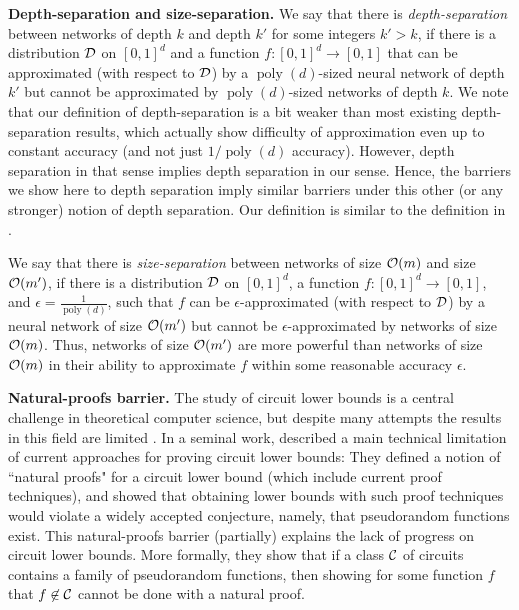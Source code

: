 \documentclass[11pt]{article}
\newcommand{\stam}[1]{}
\newcommand{\co}{{\cal O}}
\newcommand{\cd}{{\cal D}}
\newcommand{\cc}{{\cal C}}
\DeclareMathOperator{\poly}{poly}
\begin{document}
\textbf{Depth-separation and size-separation.}
We say that there is {\em depth-separation} between networks of depth $k$ and depth $k'$ for some integers $k'>k$, if there is a distribution $\cd$ on $[0,1]^d$ and a function $f:[0,1]^d \rightarrow [0,1]$ that can be approximated (with respect to $\cd$) by a $\poly(d)$-sized neural network of depth $k'$ but cannot be approximated by $\poly(d)$-sized networks of depth $k$.
%
We note that our definition of depth-separation is a bit weaker than most existing depth-separation results, which actually show difficulty of approximation even up to constant accuracy (and not just $1/\poly(d)$ accuracy). However, depth separation in that sense implies depth separation in our sense. Hence, the barriers we show here to depth separation imply similar barriers under this other (or any stronger) notion of depth separation. Our definition is similar to the definition in \cite{vardi2020neural}.

We say that there is {\em size-separation} between networks of size $\co(m)$ and size $\co(m')$, if there is a distribution $\cd$ on $[0,1]^d$, a function $f:[0,1]^d \rightarrow[0,1]$, and $\epsilon=\frac{1}{\poly(d)}$, such that $f$ can be $\epsilon$-approximated (with respect to $\cd$) by a neural network of size $\co(m')$ but cannot be $\epsilon$-approximated by networks of size $\co(m)$.
Thus, networks of size $\co(m')$ are more powerful than networks of size $\co(m)$ in their ability to approximate $f$ within some reasonable accuracy $\epsilon$.
%
\stam{
Some stronger notions of size separations may also be considered, and we note that the barriers we show here to size separation imply similar barriers under stronger notions. 
Our positive results for size separation 
hold already for a constant $\epsilon$.
}%

\textbf{Natural-proofs barrier.}
The study of circuit lower bounds is a central challenge in theoretical computer science, but despite many attempts the results in this field are limited \citep{arora2009computational}.
In a seminal work, \cite{razborov1997natural} described a main technical limitation of current approaches for proving circuit lower bounds: They defined a notion of ``natural proofs" for a circuit lower bound (which include current proof techniques), and showed that obtaining lower bounds with such proof techniques would violate a widely accepted conjecture, namely,
that pseudorandom functions exist. This natural-proofs barrier (partially) explains the lack of progress on circuit lower bounds.
More formally, they show that if a class $\cc$ of circuits contains a family of pseudorandom functions, then showing for some function $f$ that $f \not \in \cc$ cannot be done with a natural proof. 
\end{document}
